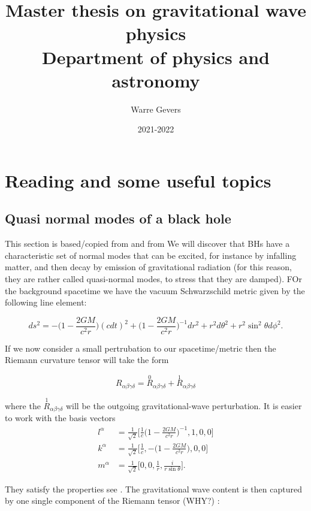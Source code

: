 \documentclass[12 pt]{article}
\title{Master thesis on gravitational wave physics\\
	\large Department of physics and astronomy}
\author{Warre Gevers}
\date{2021-2022}
\begin{document}
\maketitle
\section{Reading and some useful topics}
\subsection{Quasi normal modes of a black hole}
This section is based/copied from \cite{creighton} and from \cite{maggiore}
We will discover that BHs have a characteristic set of normal modes that can be excited, for instance by infalling matter, and then decay by emission of gravitational radiation (for this reason, they are rather called quasi-normal modes, to stress that they are damped).
FOr the background spacetime we have the vacuum Schwarzschild metric given by the following line element:

\begin{equation}
	ds^2 = - \big(1-\frac{2GM}{c^2r} \big) (cdt)^2 + \big(1-\frac{2GM}{c^2r} \big)^{-1} dr^2 + r^2 d\theta^2 + r^2 \sin^2 \theta d \phi^2 .
\end{equation}

If we now consider a small pertrubation to our spacetime/metric then the Riemann curvature tensor will take the form

\begin{equation*}
	R_{\alpha \beta \gamma \delta} = \stackrel{0}{R}_{\alpha \beta \gamma \delta} + \stackrel{1}{R}_{\alpha \beta \gamma \delta}
\end{equation*}

where the $\stackrel{1}{R}_{\alpha \beta \gamma \delta}$ will be the outgoing gravitational-wave perturbation. It is easier to work with the basis vectors 
\begin{align}
	l^{\alpha} &= \frac{1}{\sqrt{2}}\big[ \frac{1}{c}\big(1-\frac{2GM}{c^2r}\big)^{-1},1,0,0 \big] \\
	k^{\alpha} &= \frac{1}{\sqrt{2}}\big[ \frac{1}{c}, -\big(1-\frac{2GM}{c^2r}\big),0,0 \big] \\
	m^{\alpha} &=  \frac{1}{\sqrt{2}}\big[ 0, 0,\frac{1}{r},\frac{i}{r \sin \theta} \big].
\end{align}

They satisfy the properties see \cite{creigthon}. The gravitational wave content is then captured by one single component of the Riemann tensor (WHY?) :
\end{document}
